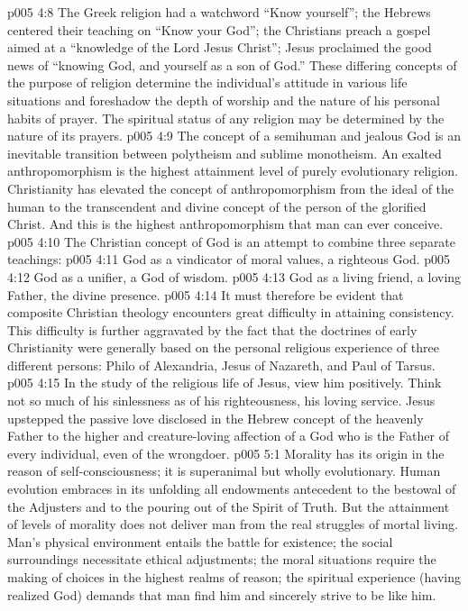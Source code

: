 \vs p005 4:8 The Greek religion had a watchword “Know yourself”; the Hebrews centered their teaching on “Know your God”; the Christians preach a gospel aimed at a “knowledge of the Lord Jesus Christ”; Jesus proclaimed the good news of \textcolor{ubdarkred}{“knowing God, and yourself as a son of God.”} These differing concepts of the purpose of religion determine the individual’s attitude in various life situations and foreshadow the depth of worship and the nature of his personal habits of prayer. The spiritual status of any religion may be determined by the nature of its prayers.
\pc \vs p005 4:9 The concept of a semihuman and jealous God is an inevitable transition between polytheism and sublime monotheism. An exalted anthropomorphism is the highest attainment level of purely evolutionary religion. Christianity has elevated the concept of anthropomorphism from the ideal of the human to the transcendent and divine concept of the person of the glorified Christ. And this is the highest anthropomorphism that man can ever conceive.
\pc \vs p005 4:10 The Christian concept of God is an attempt to combine three separate teachings:
\pc \vs p005 4:11 \bibnobreakspace {}God as a vindicator of moral values, a righteous God.
\vs p005 4:12 \bibnobreakspace {}God as a unifier, a God of wisdom.
\vs p005 4:13 \bibnobreakspace {}God as a living friend, a loving Father, the divine presence.
\pc \vs p005 4:14 It must therefore be evident that composite Christian theology encounters great difficulty in attaining consistency. This difficulty is further aggravated by the fact that the doctrines of early Christianity were generally based on the personal religious experience of three different persons: Philo of Alexandria, Jesus of Nazareth, and Paul of Tarsus.
\pc \vs p005 4:15 In the study of the religious life of Jesus, view him positively. Think not so much of his sinlessness as of his righteousness, his loving service. Jesus upstepped the passive love disclosed in the Hebrew concept of the heavenly Father to the higher  and creature\hyp{}loving affection of a God who is the Father of every individual, even of the wrongdoer.\plusone
{}
\vs p005 5:1 Morality has its origin in the reason of self\hyp{}consciousness; it is superanimal but wholly evolutionary. Human evolution embraces in its unfolding all endowments antecedent to the bestowal of the Adjusters and to the pouring out of the Spirit of Truth. But the attainment of levels of morality does not deliver man from the real struggles of mortal living. Man’s physical environment entails the battle for existence; the social surroundings necessitate ethical adjustments; the moral situations require the making of choices in the highest realms of reason; the spiritual experience (having realized God) demands that man find him and sincerely strive to be like him.
